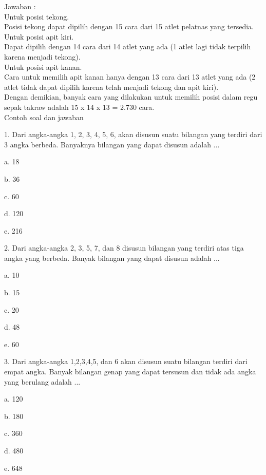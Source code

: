 \documentclass[11pt,fleqn]{book} %
\begin{document}
Jawaban :\\

Untuk posisi tekong.\\

Posisi tekong dapat dipilih dengan 15 cara dari 15 atlet pelatnas yang tersedia.\\

Untuk posisi apit kiri.\\

Dapat dipilih dengan 14 cara dari 14 atlet yang ada (1 atlet lagi tidak terpilih karena menjadi tekong).\\

Untuk posisi apit kanan.\\

Cara untuk memilih apit kanan hanya dengan 13 cara dari 13 atlet yang ada (2 atlet tidak dapat dipilih karena telah menjadi tekong dan apit kiri).\\

Dengan demikian, banyak cara yang dilakukan untuk memilih posisi dalam regu sepak takraw adalah 15 x 14 x 13 = 2.730 cara.\\

 
Contoh soal dan jawaban

1. Dari angka-angka 1, 2, 3, 4, 5, 6, akan disusun suatu bilangan yang terdiri dari 3 angka berbeda. Banyaknya bilangan yang dapat disusun adalah ... 

a.	18

b.	36

c.	60

d.	120

e.	216



2. Dari angka-angka 2, 3, 5, 7, dan 8 disusun bilangan yang terdiri atas tiga angka yang berbeda. Banyak bilangan yang dapat disusun adalah ... 

a.	10

b.	15

c.	20

d.	48

e.	60


3. Dari angka-angka 1,2,3,4,5, dan 6 akan disusun suatu bilangan terdiri dari empat angka. Banyak bilangan genap yang dapat tersusun dan tidak ada angka yang berulang adalah ... 

a.	120

b.	180

c.	360

d.	480

e.	648 
\end{document}
